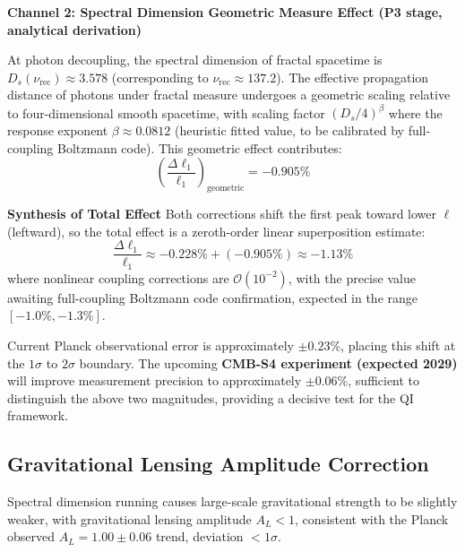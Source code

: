 \documentclass[12pt,a4paper,twocolumn]{article}
\begin{document}
\textbf{Channel 2: Spectral Dimension Geometric Measure Effect (P3 stage, analytical derivation)}

At photon decoupling, the spectral dimension of fractal spacetime is $D_s(\nu_{\text{rec}}) \approx 3.578$ (corresponding to $\nu_{\text{rec}} \approx 137.2$). The effective propagation distance of photons under fractal measure undergoes a geometric scaling relative to four-dimensional smooth spacetime, with scaling factor $(D_s/4)^\beta$ where the response exponent $\beta \approx 0.0812$ (heuristic fitted value, to be calibrated by full-coupling Boltzmann code). This geometric effect contributes:
\[
\left(\frac{\Delta\ell_1}{\ell_1}\right)_{\text{geometric}} = -0.905\%
\]

\textbf{Synthesis of Total Effect}
Both corrections shift the first peak toward lower $\ell$ (leftward), so the total effect is a zeroth-order linear superposition estimate:
\[
\frac{\Delta\ell_1}{\ell_1} \approx -0.228\% + (-0.905\%) \approx -1.13\%
\]
where nonlinear coupling corrections are $\mathcal{O}(10^{-2})$, with the precise value awaiting full-coupling Boltzmann code confirmation, expected in the range $[-1.0\%, -1.3\%]$.

Current Planck observational error is approximately $\pm 0.23\%$, placing this shift at the $1\sigma$ to $2\sigma$ boundary. The upcoming \textbf{CMB-S4 experiment (expected 2029)} will improve measurement precision to approximately $\pm 0.06\%$, sufficient to distinguish the above two magnitudes, providing a decisive test for the QI framework.

\subsection{Gravitational Lensing Amplitude Correction}
Spectral dimension running causes large-scale gravitational strength to be slightly weaker, with gravitational lensing amplitude $A_L < 1$, consistent with the Planck observed $A_L = 1.00 \pm 0.06$ trend, deviation $<1\sigma$.
\end{document}
